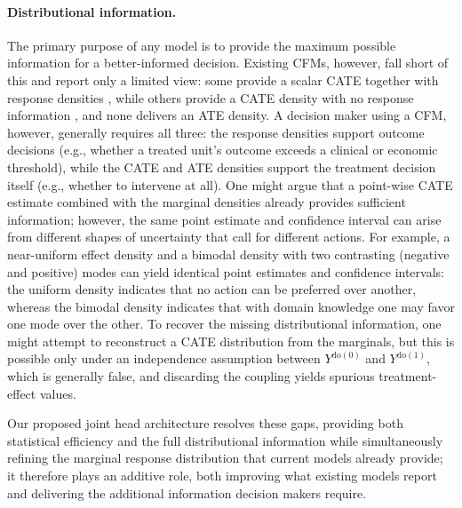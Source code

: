 \documentclass[11pt]{article}
\begin{document}
\paragraph{Distributional information.}

The primary purpose of any model is to provide the maximum possible information for a better-informed decision. Existing CFMs, however, fall short of this and report only a limited view: some provide a scalar CATE together with response densities \citep{dopfn, uwyk, causalpfn}, while others provide a CATE density with no response information \citep{ma2026causalfm}, and none delivers an ATE density. A decision maker using a CFM, however, generally requires all three: the response densities support outcome decisions (e.g., whether a treated unit's outcome exceeds a clinical or economic threshold), while the CATE and ATE densities support the treatment decision itself (e.g., whether to intervene at all). One might argue that a point-wise CATE estimate combined with the marginal densities already provides sufficient information; however, the same point estimate and confidence interval can arise from different shapes of uncertainty that call for different actions. For example, a near-uniform effect density and a bimodal density with two contrasting (negative and positive) modes can yield identical point estimates and confidence intervals: the uniform density indicates that no action can be preferred over another, whereas the bimodal density indicates that with domain knowledge one may favor one mode over the other. To recover the missing distributional information, one might attempt to reconstruct a CATE distribution from the marginals, but this is possible only under an independence assumption between $Y^{\mathrm{do}(0)}$ and $Y^{\mathrm{do}(1)}$, which is generally false, and discarding the coupling yields spurious treatment-effect values. 

Our proposed joint head architecture resolves these gaps, providing both statistical efficiency and the full distributional information while simultaneously refining the marginal response distribution that current models already provide; it therefore plays an additive role, both improving what existing models report and delivering the additional information decision makers require.

\end{document}
